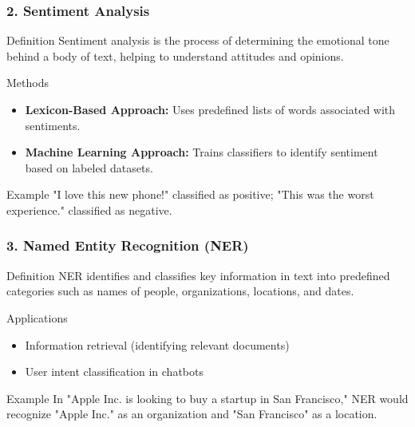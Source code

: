 \documentclass[aspectratio=169]{beamer}
\begin{document}
\begin{frame}
    \frametitle{2. Sentiment Analysis}
    \begin{block}{Definition}
        Sentiment analysis is the process of determining the emotional tone behind a body of text, helping to understand attitudes and opinions.
    \end{block}
    
    \begin{block}{Methods}
        \begin{itemize}
            \item \textbf{Lexicon-Based Approach:} Uses predefined lists of words associated with sentiments.
            \item \textbf{Machine Learning Approach:} Trains classifiers to identify sentiment based on labeled datasets.
        \end{itemize}
    \end{block}
    
    \begin{block}{Example}
        "I love this new phone!" classified as positive; "This was the worst experience." classified as negative.
    \end{block}
\end{frame}

\begin{frame}
    \frametitle{3. Named Entity Recognition (NER)}
    \begin{block}{Definition}
        NER identifies and classifies key information in text into predefined categories such as names of people, organizations, locations, and dates.
    \end{block}
    
    \begin{block}{Applications}
        \begin{itemize}
            \item Information retrieval (identifying relevant documents)
            \item User intent classification in chatbots
        \end{itemize}
    \end{block}
    
    \begin{block}{Example}
        In "Apple Inc. is looking to buy a startup in San Francisco," NER would recognize "Apple Inc." as an organization and "San Francisco" as a location.
    \end{block}
\end{frame}
\end{document}
